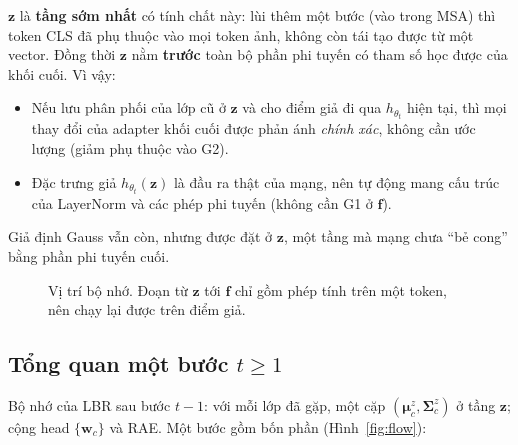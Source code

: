\documentclass[11pt]{article}
\newcommand{\bmu}{\boldsymbol{\mu}}
\newcommand{\bSigma}{\boldsymbol{\Sigma}}
\newcommand{\vf}{\mathbf{f}}
\newcommand{\vx}{\mathbf{x}}
\newcommand{\vz}{\mathbf{z}}
\newcommand{\vw}{\mathbf{w}}
\newcommand{\LN}{\mathrm{LN}}
\newcommand{\muz}{\bmu^{z}}
\newcommand{\Sz}{\bSigma^{z}}
\begin{document}
$\vz$ là \textbf{tầng sớm nhất} có tính chất này: lùi thêm một bước (vào trong MSA) thì token CLS đã phụ thuộc vào mọi
token ảnh, không còn tái tạo được từ một vector. Đồng thời $\vz$ nằm \textbf{trước} toàn bộ phần phi tuyến có tham số
học được của khối cuối. Vì vậy:
\begin{itemize}
\item Nếu lưu phân phối của lớp cũ ở $\vz$ và cho điểm giả đi qua $h_{\theta_t}$ hiện tại, thì mọi thay đổi của adapter
      khối cuối được phản ánh \emph{chính xác}, không cần ước lượng (giảm phụ thuộc vào G2).
\item Đặc trưng giả $h_{\theta_t}(\vz)$ là đầu ra thật của mạng, nên tự động mang cấu trúc của LayerNorm và các phép
      phi tuyến (không cần G1 ở $\vf$).
\end{itemize}
Giả định Gauss vẫn còn, nhưng được đặt ở $\vz$, một tầng mà mạng chưa ``bẻ cong'' bằng phần phi tuyến cuối.

\begin{figure}[H]
\centering
{}
\caption{Vị trí bộ nhớ. Đoạn từ $\vz$ tới $\vf$ chỉ gồm phép tính trên một token, nên chạy lại được trên điểm giả.}
\label{fig:where}
\end{figure}

\subsection{Tổng quan một bước $t\ge1$}
Bộ nhớ của LBR sau bước $t-1$: với mỗi lớp đã gặp, một cặp $(\muz_c,\Sz_c)$ ở tầng $\vz$; cộng head
$\{\vw_c\}$ và RAE. Một bước gồm bốn phần (Hình~\ref{fig:flow}):
\end{document}
